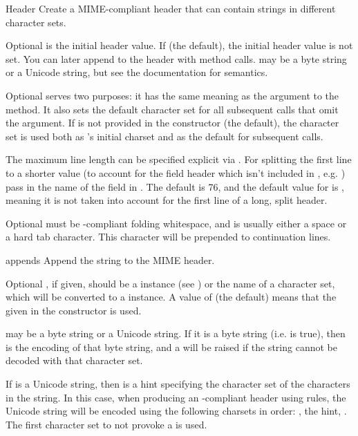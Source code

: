 \begin{classdesc}{Header}{}
Create a MIME-compliant header that can contain strings in different
character sets.

Optional  is the initial header value.  If  (the
default), the initial header value is not set.  You can later append
to the header with  method calls.   may be a
byte string or a Unicode string, but see the 
documentation for semantics.

Optional  serves two purposes: it has the same meaning as
the  argument to the  method.  It also
sets the default character set for all subsequent 
calls that omit the  argument.  If  is not
provided in the constructor (the default), the 
character set is used both as 's initial charset and as the
default for subsequent  calls.

The maximum line length can be specified explicit via
.  For splitting the first line to a shorter value (to
account for the field header which isn't included in ,
e.g. ) pass in the name of the field in
.  The default  is 76, and the
default value for  is , meaning it is not
taken into account for the first line of a long, split header.

Optional  must be -compliant folding
whitespace, and is usually either a space or a hard tab character.
This character will be prepended to continuation lines.
\end{classdesc}

\begin{methoddesc}[Header]{append}{s}
Append the string  to the MIME header.

Optional , if given, should be a  instance
(see ) or the name of a character set, which
will be converted to a  instance.  A value of
 (the default) means that the  given in the
constructor is used.

 may be a byte string or a Unicode string.  If it is a byte
string (i.e.  is true), then
 is the encoding of that byte string, and a
 will be raised if the string cannot be
decoded with that character set.

If  is a Unicode string, then  is a hint
specifying the character set of the characters in the string.  In this
case, when producing an -compliant header using 
rules, the Unicode string will be encoded using the following charsets
in order: , the  hint, .  The
first character set to not provoke a  is used.
\end{methoddesc}

